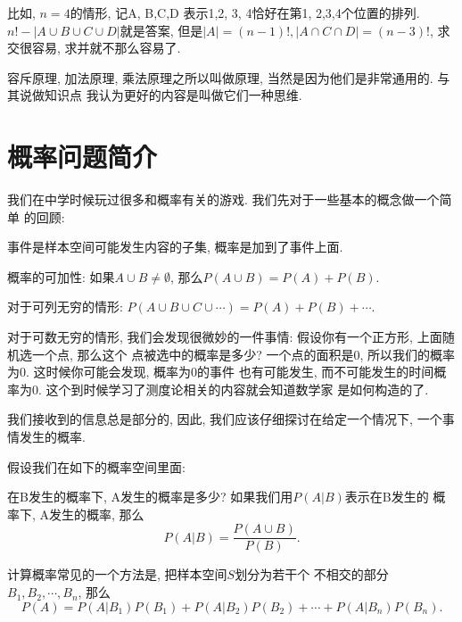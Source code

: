比如, $n=4$的情形, 记A, B,C,D 表示1,2, 3, 4恰好在第1, 2,3,4个位置的排列. 
$n!-|A\cup B\cup C\cup D|$就是答案, 但是$|A|=(n-1)!, |A\cap C\cap D|=
(n-3)!$, 求交很容易, 求并就不那么容易了. 

容斥原理, 加法原理, 乘法原理之所以叫做原理, 当然是因为他们是非常通用的. 与其说做知识点
我认为更好的内容是叫做它们一种思维. 


\section{概率问题简介} 

 我们在中学时候玩过很多和概率有关的游戏. 我们先对于一些基本的概念做一个简单
的回顾: 


\begin{definition}
    事件是样本空间可能发生内容的子集, 概率是加到了事件上面. 
\end{definition}

\begin{axiom}
    概率的可加性: 如果$A\cup B\neq \emptyset$, 那么$P(A\cup B)=P(A)+P(B)$. 

    对于可列无穷的情形: $P(A\cup B\cup C\cup\cdots)=P(A)+P(B)+\cdots$. 
\end{axiom}
对于可数无穷的情形, 我们会发现很微妙的一件事情: 假设你有一个正方形, 上面随机选一个点, 那么这个
点被选中的概率是多少? 一个点的面积是0, 所以我们的概率为0. 这时候你可能会发现, 概率为0的事件
也有可能发生, 而不可能发生的时间概率为0. 这个到时候学习了测度论相关的内容就会知道数学家
是如何构造的了. 

我们接收到的信息总是部分的, 因此, 我们应该仔细探讨在给定一个情况下, 一个事情发生的概率. 

假设我们在如下的概率空间里面: 


 在B发生的概率下, A发生的概率是多少? 如果我们用$P(A|B)$表示在B发生的
概率下, A发生的概率, 那么
$$
P(A|B) = \frac{P(A\cup B)}{P(B)}. 
$$

 计算概率常见的一个方法是, 把样本空间$S$划分为若干个
不相交的部分$B_1, B_2, \cdots, B_n$, 那么
$$P(A)=P(A|B_1)P(B_1)+P(A|B_2)P(B_2)+\cdots+P(A|B_n)P(B_n).$$

